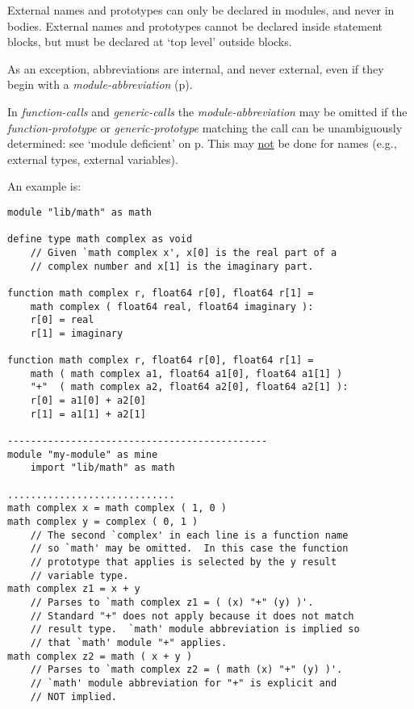 \documentclass[12pt]{article}
\newcommand{\pagref}[1]{p\pageref{#1}}
\newenvironment{indpar}[1][0.3in]%
	{\begin{list}{}%
		     {\setlength{\itemsep}{0in}%
		      \setlength{\topsep}{0in}%
		      \setlength{\parsep}{1ex}%
		      \setlength{\labelwidth}{#1}%
		      \setlength{\leftmargin}{#1}%
		      \addtolength{\leftmargin}{\labelsep}}%
	 \item}%
	{\end{list}}
\begin{document}
External names and prototypes can only be declared in modules, and
never in bodies.  External names and prototypes cannot be declared inside
statement blocks, but must be declared at `top level' outside
blocks.

As an exception, abbreviations are internal, and never external, even if
they begin with a {\em module-abbreviation}
(\pagref{ABBREVIATIONS-ARE-INTERNAL}).

In {\em function-calls} and {\em generic-calls} the
{\em module-abbreviation} may be omitted
if the {\em function-proto\-type} or {\em generic-prototype} matching the call
can be unambiguously determined: see
`module deficient' on \pagref{MODULE-DEFICIENT}.
This may \underline{not} be done
for names (e.g., external types, external variables).

An example is:
\begin{indpar}\begin{verbatim}
module "lib/math" as math

define type math complex as void
    // Given `math complex x', x[0] is the real part of a
    // complex number and x[1] is the imaginary part.

function math complex r, float64 r[0], float64 r[1] =
    math complex ( float64 real, float64 imaginary ):
    r[0] = real
    r[1] = imaginary

function math complex r, float64 r[0], float64 r[1] =
    math ( math complex a1, float64 a1[0], float64 a1[1] )
    "+"  ( math complex a2, float64 a2[0], float64 a2[1] ):
    r[0] = a1[0] + a2[0]
    r[1] = a1[1] + a2[1]

---------------------------------------------
module "my-module" as mine
    import "lib/math" as math

.............................
math complex x = math complex ( 1, 0 )
math complex y = complex ( 0, 1 )
    // The second `complex' in each line is a function name
    // so `math' may be omitted.  In this case the function
    // prototype that applies is selected by the y result
    // variable type.
math complex z1 = x + y
    // Parses to `math complex z1 = ( (x) "+" (y) )'.
    // Standard "+" does not apply because it does not match
    // result type.  `math' module abbreviation is implied so
    // that `math' module "+" applies.
math complex z2 = math ( x + y )
    // Parses to `math complex z2 = ( math (x) "+" (y) )'.
    // `math' module abbreviation for "+" is explicit and
    // NOT implied.
\end{verbatim}\end{indpar}
\end{document}
